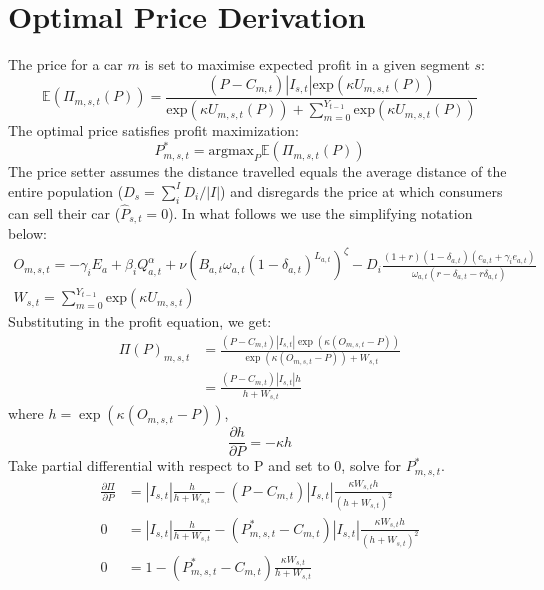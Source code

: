 \documentclass[12pt]{article}
\begin{document}
	\section{Optimal Price Derivation} \label{Appendix_Price_Derivation}
	The price for a car $m$ is set to maximise expected profit in a given segment $s$:
	\begin{equation}
		\mathbb{E}(\Pi_{m,s,t}(P))=\frac{(P-C_{m,t})|I_{s,t}|\text{exp}\left(\kappa U_{m,s,t}(P)\right)}{\text{exp}\left(\kappa U_{m,s,t}(P)\right)+\sum_{m=0}^{Y_{t-1}}\text{exp}\left(\kappa U_{m,s,t}(P)\right)} 
	\end{equation}
	The optimal price satisfies profit maximization:
	\begin{equation}
		P^*_{m,s,t}=\text{argmax}_P \mathbb{E}\left(\Pi_{m,s,t}(P)\right)
	\end{equation}
	The price setter assumes the distance travelled equals the average distance of the entire population ($D_s=\sum_i^{I}{D_i}/|I|$) and disregards the price at which consumers can sell their car ($\hat{P}_{s,t}=0$). In what follows we use the simplifying notation below:
	\begin{equation}
		\begin{aligned}
			O_{m,s,t}= -\gamma_iE_{a}+\beta_iQ_{a,t}^\alpha+\nu(B_{a,t}\omega_{a,t}(1-\delta_{a,t})^{L_{a,t}})^{\zeta}-D_i\frac{(1+r)(1-\delta_{a,t})(c_{a,t}+\gamma_ie_{a,t})}{\omega_{a,t}(r-\delta_{a,t}-r\delta_{a,t})}\\
			W_{s,t} = \sum_{m=0}^{Y_{t-1}}\text{exp}(\kappa U_{m,s,t})
		\end{aligned}
	\end{equation}
	Substituting in the profit equation, we get:
	\begin{align}
		\Pi(P)_{m,s,t} &=\frac{(P-C_{m,t})|I_{s,t}|\exp{(\kappa(O_{m,s,t}-P))}}{\exp{(\kappa(O_{m,s,t}-P))}+W_{s,t}}\\
		&= \frac{(P-C_{m,t})|I_{s,t}|h}{h+W_{s,t}}
	\end{align}
	where $h = \exp{(\kappa(O_{m,s,t}-P))}$,
	\begin{equation}
		\frac{\partial h}{\partial P} = -\kappa h
	\end{equation}
	Take partial differential with respect to P and set to 0, solve for $P^*_{m,s,t}$.
	\begin{align}
		\frac{\partial \Pi}{\partial P} &= |I_{s,t}| \frac{h}{h + W_{s,t}} - (P-C_{m,t})|I_{s,t}|\frac{\kappa  W_{s,t} h }{(h+W_{s,t})^2}\\
		0 &= |I_{s,t}| \frac{h}{h + W_{s,t}} - (P^*_{m,s,t}-C_{m,t})|I_{s,t}|\frac{\kappa W_{s,t} h }{(h+W_{s,t})^2}\\
		0 &= 1 - (P^*_{m,s,t}-C_{m,t})\frac{\kappa  W_{s,t} }{h+W_{s,t}}
	\end{align}
\end{document}
